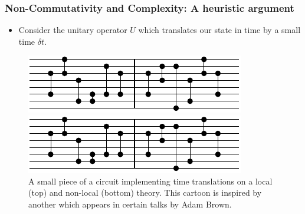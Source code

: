 \documentclass[8pt,aspectratio=169]{beamer}
\begin{document}
\begin{frame}
\frametitle{Non-Commutativity and Complexity: A heuristic argument}

\begin{minipage}[t]{0.5\linewidth}

\begin{itemize}

\item Consider the unitary operator $U$ which translates our state in time by a small time $\delta t$. 

\end{itemize}

\end{minipage}\hfill
%
\begin{minipage}[t]{0.48\linewidth}

\begin{figure}
    \begin{center}
    
        \includegraphics[scale=1]{animation/animation_1}    
        
        \vspace{2mm}
        
        \includegraphics[scale=1]{animation/animation_1}    
    
    \end{center}
    \caption{A small piece of a circuit implementing time translations on a local (top) and non-local (bottom) theory. This cartoon is inspired by another which appears in certain talks by Adam Brown.}
\end{figure}

\end{minipage}

\end{frame}
\end{document}
